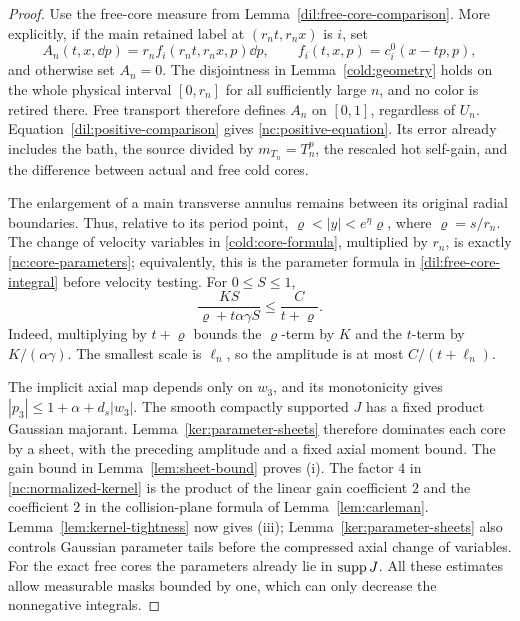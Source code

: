 \begin{proof}
Use the free-core measure from Lemma~\ref{dil:free-core-comparison}.
More explicitly, if the main retained label at \((r_nt,r_nx)\) is
\(i\), set
\[
 A_n(t,x,\dd p)=r_n f_i(r_nt,r_nx,p)\dd p,
 \qquad f_i(t,x,p)=c_i^0(x-tp,p),
\]
and otherwise set \(A_n=0\). The disjointness in
Lemma~\ref{cold:geometry} holds on the whole physical interval
\([0,r_n]\) for all sufficiently large \(n\), and no color is
retired there. Free transport therefore defines \(A_n\) on
\([0,1]\), regardless of \(U_n\). Equation~\eqref{dil:positive-comparison}
gives \eqref{nc:positive-equation}. Its error already includes
the bath, the source divided by \(m_{T_n}=T_n^p\), the rescaled
hot self-gain, and the difference between actual and free cold cores.

The enlargement of a main transverse annulus remains between its
original radial boundaries. Thus, relative to its period point,
\(\varrho<|y|<e^\eta\varrho\), where \(\varrho=s/r_n\). The change of velocity
variables in \eqref{cold:core-formula}, multiplied by \(r_n\), is
exactly \eqref{nc:core-parameters}; equivalently, this is the
parameter formula in \eqref{dil:free-core-integral} before velocity
testing. For \(0\le S\le1\),
\[
 \frac{KS}{\varrho+t\alpha\gamma S}
 \le \frac{C}{t+\varrho}.
\]
Indeed, multiplying by \(t+\varrho\) bounds the \(\varrho\)-term by \(K\)
and the \(t\)-term by \(K/(\alpha\gamma)\). The smallest scale is
\(\ell_n\), so the amplitude is at most \(C/(t+\ell_n)\).

The implicit axial map depends only on \(w_3\), and its monotonicity
gives \(|p_3|\le1+\alpha+d_s|w_3|\). The smooth compactly supported
\(J\) has a fixed product Gaussian majorant. Lemma~\ref{ker:parameter-sheets}
therefore dominates each core by a sheet, with the preceding amplitude
and a fixed axial moment bound. The gain bound in
Lemma~\ref{lem:sheet-bound} proves (i). The factor \(4\) in
\eqref{nc:normalized-kernel} is the product of the linear gain
coefficient \(2\) and the coefficient \(2\) in the collision-plane
formula of Lemma~\ref{lem:carleman}. Lemma~\ref{lem:kernel-tightness}
now gives (iii); Lemma~\ref{ker:parameter-sheets} also controls
Gaussian parameter tails before the compressed axial change of
variables. For the exact free cores the parameters already lie in
\(\operatorname{supp} J\). All these estimates allow measurable masks bounded by
one, which can only decrease the nonnegative integrals.
\end{proof}

